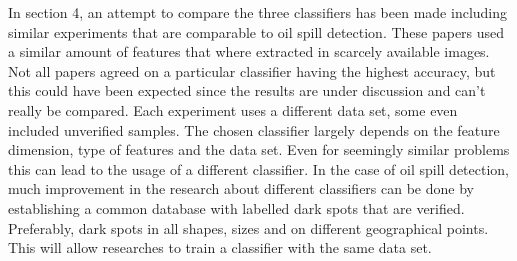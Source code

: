 In section 4, an attempt to compare the three classifiers has been made including similar experiments that are comparable to oil spill detection. These papers used a similar amount of features that where extracted in scarcely available images. \\ Not all papers agreed on a particular classifier having the highest accuracy, but this could have been expected since the results are under discussion and can't really be compared. Each experiment uses a different data set, some even included unverified samples. The chosen classifier largely depends on the feature dimension, type of features and the data set. Even for seemingly similar problems this can lead to the usage of a different classifier. In the case of oil spill detection, much improvement in the research about different classifiers can be done by establishing a common database with labelled dark spots that are verified. Preferably, dark spots in all shapes, sizes and on different geographical points. This will allow researches to train a classifier with the same data set.